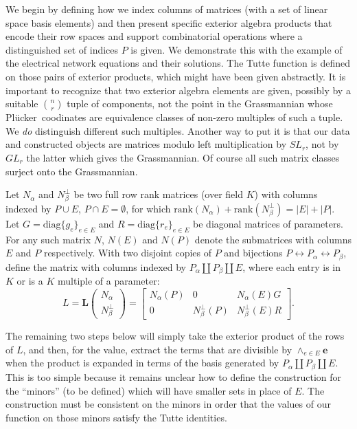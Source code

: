\documentclass[Unicode]{cedram-alco}
\newcommand{\ext}[1]{\ensuremath{\mathbf{#1}}}
\newcommand{\Plucker}{Pl\"{u}cker\ }
\newcommand{\Nal}{\ensuremath{N_{\alpha}}}
\newcommand{\NbePe}{\ensuremath{N_{\beta}^{\perp}}}
\newcommand{\dunion}{\coprod}
\newcommand{\LVert}[2]{\ext{L}\left( \begin{array}{c} {#1}\\ {#2} \end{array} \right)}
\begin{document}
\noindent
We begin by defining how we index columns of matrices (with a set of
linear space basis elements) and then
present specific
exterior algebra products that encode their row spaces and support
combinatorial operations where a distinguished set of indices $P$ is given.
We demonstrate this with the example
of the electrical network equations and their solutions.
The Tutte function is defined
on those pairs of exterior products, which might have been given abstractly.
It is important to recognize that two exterior algebra elements are given,
possibly by a suitable $\binom{n}{r}$ tuple of components, not the point in the Grassmannian
whose \Plucker coodinates are equivalence classes of non-zero multiples of
such a tuple.  We \emph{do} distinguish different such multiples.  Another way
to put it is that our data and constructed objects are matrices modulo left multiplication
by $SL_r$, not by $GL_r$ the latter which gives the Grassmannian.  Of course all such matrix
classes surject onto the Grassmannian.



Let $\Nal$ and $\NbePe$ be two full row rank matrices (over field $K$)
with
columns indexed by $P\cup E$, $P\cap E=\emptyset$, for which
$\text{rank}(\Nal)+\text{rank}(\NbePe)=|E|+|P|$.  Let
$G=\text{diag}\{g_e\}_{e\in E} $ and $R=\text{diag}\{r_e\}_{e\in E} $
be diagonal matrices of parameters.  For any such matrix $N$, $N(E)$ and
$N(P)$ denote the submatrices with columns $E$ and $P$ respectively. With
two disjoint copies of $P$ and bijections
$P \leftrightarrow P_{\alpha}\leftrightarrow P_{\beta}$, define the matrix
with columns indexed by $P_\alpha \dunion P_\beta \dunion E$, where each entry
is in $K$ or is a $K$ multiple of a parameter:
\[
    L = \LVert{\Nal}{\NbePe}
    = \left[\begin{array}{c|c|c} \Nal(P)  &  0  &  \Nal(E)G \\  \hline
        0  & \NbePe(P)  &  \NbePe(E)R \end{array}\right].
\]

The remaining two steps below will simply take the exterior product of the rows of $L$, and
then, for the value, extract the terms that are divisible by $\wedge_{e \in E}\ext{e}$ when the product
is expanded in terms of the basis generated by $P_\alpha \dunion P_\beta \dunion E$.
This is too simple because it remains unclear how to define the construction for the
``minors'' (to be defined) which will have smaller sets in place of $E$. The
construction must be consistent on the minors in order that the values
of our function on those minors satisfy the Tutte identities. 
\end{document}
